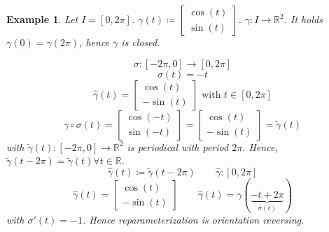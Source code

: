 \documentclass{article}
\newtheorem{example}{Example}  \numberwithin{example}{section}
\begin{document}
\begin{example}
  Let $I = [0,2\pi]$. $\gamma(t) \coloneqq \begin{bmatrix} \cos(t) \\ \sin(t) \end{bmatrix}$. $\gamma: I \to \mathbb R^2$.
  It holds $\gamma(0) = \gamma(2\pi)$, hence $\gamma$ is closed.


  \[ \sigma: [-2\pi, 0] \to [0, 2\pi] \]
  \[ \sigma(t) = -t \]
  \[ \hat\gamma(t) = \begin{bmatrix} \cos(t) \\ -\sin(t) \end{bmatrix} \text{ with } t \in [0,2\pi] \]
  \[ \gamma \circ \sigma(t) = \begin{bmatrix} \cos(-t) \\ \sin(-t) \end{bmatrix} = \begin{bmatrix} \cos(t) \\ -\sin(t) \end{bmatrix} = \tilde\gamma(t) \]
  with $\tilde\gamma(t): [-2\pi, 0] \to \mathbb R^2$ is periodical with period $2\pi$.
  Hence, $\tilde\gamma(t - 2\pi) = \tilde\gamma(t) \forall t \in \mathbb R$.
  \[ \hat\gamma(t) \coloneqq \tilde\gamma(t - 2\pi) \qquad \hat\gamma: [0, 2\pi] \]
  \[ \hat{\gamma}(t) = \begin{bmatrix} \cos(t) \\ -\sin(t) \end{bmatrix} \qquad \hat{\gamma}(t) = \gamma(\underbrace{-t + 2\pi}_{\sigma(t)}) \]
  with $\sigma'(t) = -1$. Hence reparameterization is orientation reversing.
\end{example}
\end{document}
